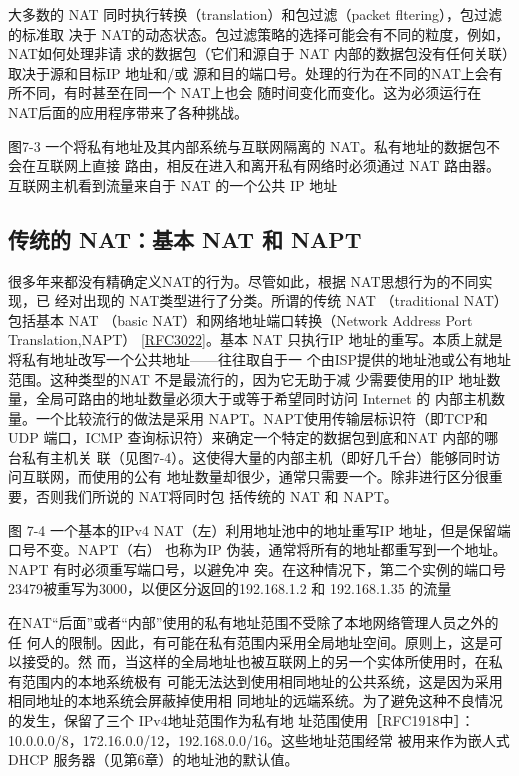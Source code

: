 大多数的 NAT 同时执行转换（translation）和包过滤（packet fltering），包过滤的标准取
决于 NAT的动态状态。包过滤策略的选择可能会有不同的粒度，例如，NAT如何处理非请
求的数据包（它们和源自于 NAT 内部的数据包没有任何关联）取决于源和目标IP 地址和/或
源和目的端口号。处理的行为在不同的NAT上会有所不同，有时甚至在同一个 NAT上也会
随时间变化而变化。这为必须运行在 NAT后面的应用程序带来了各种挑战。

图7-3 一个将私有地址及其内部系统与互联网隔离的 NAT。私有地址的数据包不会在互联网上直接
路由，相反在进入和离开私有网络时必须通过 NAT 路由器。互联网主机看到流量来自于 NAT
的一个公共 IP 地址

\subsection{传统的 NAT：基本 NAT 和 NAPT}

很多年来都没有精确定义NAT的行为。尽管如此，根据 NAT思想行为的不同实现，已
经对出现的 NAT类型进行了分类。所谓的传统 NAT （traditional NAT）包括基本 NAT （basic
NAT）和网络地址端口转换（Network Address Port Translation,NAPT）
\href{https://www.rfc-editor.org/rfc/rfc3022}{[RFC3022]}。基本
NAT 只执行IP 地址的重写。本质上就是将私有地址改写一个公共地址——往往取自于一
个由ISP提供的地址池或公有地址范围。这种类型的NAT 不是最流行的，因为它无助于减
少需要使用的IP 地址数量，全局可路由的地址数量必须大于或等于希望同时访问 Internet 的
内部主机数量。一个比较流行的做法是采用 NAPT。NAPT使用传输层标识符（即TCP和
UDP 端口，ICMP 查询标识符）来确定一个特定的数据包到底和NAT 内部的哪台私有主机关
联（见图7-4）。这使得大量的内部主机（即好几千台）能够同时访问互联网，而使用的公有
地址数量却很少，通常只需要一个。除非进行区分很重要，否则我们所说的 NAT将同时包
括传统的 NAT 和 NAPT。

图 7-4
一个基本的IPv4 NAT（左）利用地址池中的地址重写IP 地址，但是保留端口号不变。NAPT（右）
也称为IP 伪装，通常将所有的地址都重写到一个地址。NAPT 有时必须重写端口号，以避免冲
突。在这种情况下，第二个实例的端口号23479被重写为3000，以便区分返回的192.168.1.2 和
192.168.1.35 的流量

在NAT“后面”或者“内部”使用的私有地址范围不受除了本地网络管理人员之外的任
何人的限制。因此，有可能在私有范围内采用全局地址空间。原则上，这是可以接受的。然
而，当这样的全局地址也被互联网上的另一个实体所使用时，在私有范围内的本地系统极有
可能无法达到使用相同地址的公共系统，这是因为采用相同地址的本地系统会屏蔽掉使用相
同地址的远端系统。为了避免这种不良情况的发生，保留了三个 IPv4地址范围作为私有地
址范围使用［RFC1918中］：10.0.0.0/8，172.16.0.0/12，192.168.0.0/16。这些地址范围经常
被用来作为嵌人式 DHCP 服务器（见第6章）的地址池的默认值。

